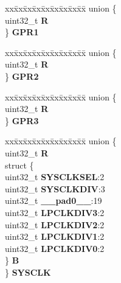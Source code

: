 \begin{DoxyCompactItemize}
\begin{tabbing}
\end{tabbing}\item 
\mbox{\label{structSIU__tag_a291c8b7c7ace7085062b1207480ab8f1}} 
\begin{tabbing}
xx\=xx\=xx\=xx\=xx\=xx\=xx\=xx\=xx\=\kill
union \{\\
\>uint32\_t {\bfseries R}\\
\} {\bfseries GPR1}\\

\end{tabbing}\item 
\mbox{\label{structSIU__tag_afc706b967b15bf8174c738a676d11df5}} 
\begin{tabbing}
xx\=xx\=xx\=xx\=xx\=xx\=xx\=xx\=xx\=\kill
union \{\\
\>uint32\_t {\bfseries R}\\
\} {\bfseries GPR2}\\

\end{tabbing}\item 
\mbox{\label{structSIU__tag_adf43a92b018e86d5af63d6587d3b024c}} 
\begin{tabbing}
xx\=xx\=xx\=xx\=xx\=xx\=xx\=xx\=xx\=\kill
union \{\\
\>uint32\_t {\bfseries R}\\
\} {\bfseries GPR3}\\

\end{tabbing}\item 
\mbox{\label{structSIU__tag_a5f50692626a123cc886c2f88c18a1fcc}} 
\begin{tabbing}
xx\=xx\=xx\=xx\=xx\=xx\=xx\=xx\=xx\=\kill
union \{\\
\>uint32\_t {\bfseries R}\\
\>struct \{\\
\>\>uint32\_t {\bfseries SYSCLKSEL}:2\\
\>\>uint32\_t {\bfseries SYSCLKDIV}:3\\
\>\>uint32\_t {\bfseries \_\_pad0\_\_}:19\\
\>\>uint32\_t {\bfseries LPCLKDIV3}:2\\
\>\>uint32\_t {\bfseries LPCLKDIV2}:2\\
\>\>uint32\_t {\bfseries LPCLKDIV1}:2\\
\>\>uint32\_t {\bfseries LPCLKDIV0}:2\\
\>\} {\bfseries B}\\
\} {\bfseries SYSCLK}\\


\end{tabbing}
\end{DoxyCompactItemize}
